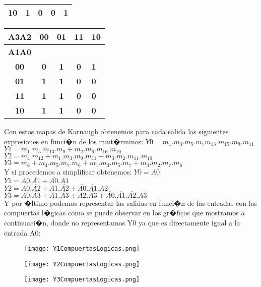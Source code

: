 \begin{table}[htb]
\begin{tabular}{|c|c|c|c|l|}
\textbf{10}   & \textbf{1}  & \textbf{0}  & \textbf{0}  & \textbf{1}  \\ \hline
\end{tabular}
\begin{tabular}{|c|c|c|c|l|}
\hline
\textbf{A3A2} & \textbf{00} & \textbf{01} & \textbf{11} & \textbf{10} \\ \hline
\textbf{A1A0} & \multicolumn{4}{c|}{\textbf{}}                        \\ \hline
\textbf{00}   & \textbf{0}  & \textbf{1}  & \textbf{0}  & \textbf{1}  \\ \hline
\textbf{01}   & \textbf{1}  & \textbf{1}  & \textbf{0}  & \textbf{0}  \\ \hline
\textbf{11}   & \textbf{1}  & \textbf{1}  & \textbf{0}  & \textbf{0}  \\ \hline
\textbf{10}   & \textbf{1}  & \textbf{1}  & \textbf{0}  & \textbf{0}  \\ \hline
\end{tabular}
\end{table}




Con estos mapas de Karnaugh obtenemos para cada salida las siguientes expresiones en funci�n de los mint�rminos:
$Y0 = m_1 . m_3 . m_5 . m_7 m_{13} . m_{15} . m_9 . m_{11}$ \\
$Y1 = m_1 . m_5 . m_{13} . m_9 + m_2 . m_6 . m_{16} . m_{10}$ \\
$Y2 = m_4 . m_{12} + m_1 . m_3 . m_9 . m_{11} + m_3 . m_2 . m_{11} . m_{10}$\\
$Y3 = m_8 + m_4 . m_5 . m_7 . m_6 + m_1 . m_3 . m_5 . m_7 + m_3 . m_2 . m_7 . m_6$\\
Y si procedemos a simplificar obtenemos:
$Y0 = A0$\\
$Y1 = A0 . \overline{A1} + \overline{A0} . A1$\\
$Y2 = A0 . \overline{A2} + A1 . \overline{A2} + \overline{A0} . \overline{A1} . A2$\\
$Y3 = A0 . \overline{A3} + A1 . \overline{A3} + A2 . \overline{A3} + \overline{A0} . \overline{A1} . \overline{A2} . A3$\\
Y por �ltimo podemos representar las salidas en funci�n de las entradas con las compuertas l�gicas como se puede observar en los gr�ficos que mostramos a continuaci�n, donde no representamos Y0 ya que es directamente igual a la entrada A0:

\begin{figure}
  \texttt{[image: Y1CompuertasLogicas.png]}
\end{figure}

\begin{figure}
  \texttt{[image: Y2CompuertasLogicas.png]}
\end{figure}

\begin{figure}
  \texttt{[image: Y3CompuertasLogicas.png]}
\end{figure}

